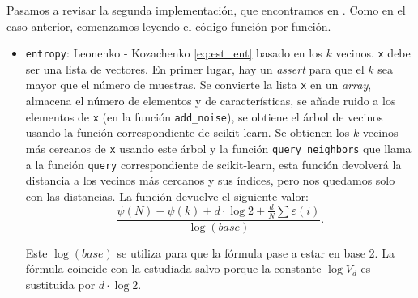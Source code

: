 \documentclass[12pt,a4paper]{report} %
\theoremstyle{definition}
\begin{document}
Pasamos a revisar la segunda implementación, que encontramos en \cite{npeet}. Como en el caso anterior, comenzamos leyendo el código función por función. 
\begin{itemize}
\item \texttt{entropy}: Leonenko - Kozachenko \ref{eq:est_ent} basado en los $k$ vecinos. \texttt{x} debe ser una lista de vectores. En primer lugar, hay un \textit{assert} para que el $k$ sea mayor que el número de muestras. Se convierte la lista \texttt{x} en un \textit{array}, almacena el número de elementos y de características, se añade ruido a los elementos de \texttt{x} (en la función \texttt{add\_noise}), se obtiene el árbol de vecinos usando la función correspondiente de scikit-learn. Se obtienen los $k$ vecinos más cercanos de \texttt{x} usando este árbol y la función \texttt{query\_neighbors} que llama a la función \texttt{query} correspondiente de scikit-learn, esta función devolverá la distancia a los vecinos más cercanos y sus índices, pero nos quedamos solo con las distancias. La función devuelve el siguiente valor:\[
  \frac{\psi(N) - \psi(k) + d \cdot \log 2 + \frac{d}{N}\sum \varepsilon(i)}{\log(base)}.
  \]

  Este $\log (base)$ se utiliza para que la fórmula pase a estar en base 2. La fórmula coincide con la estudiada salvo porque la constante $\log V_d$ es sustituida por $d \cdot \log 2$.


\end{itemize}
\end{document}
